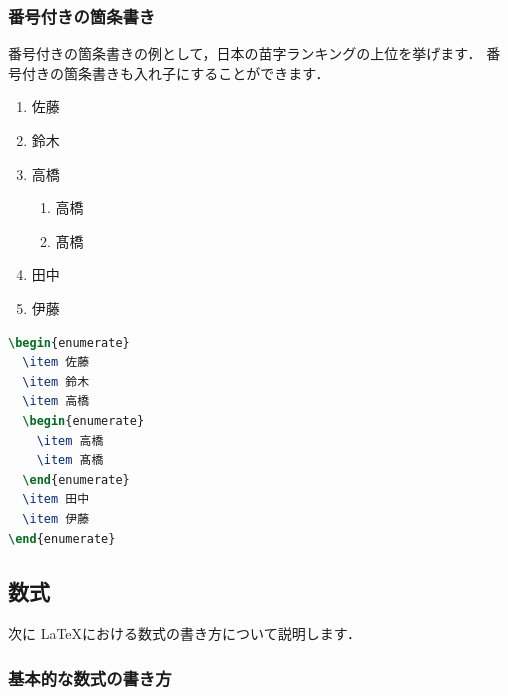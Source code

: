 \documentclass[
    paper=a4paper,      %
    article,            %
    fontsize=11pt,      %
    jafontsize=11pt,    %
    head_space=25mm,    %
    foot_space=25mm,    %
    gutter=20mm,        %
    fore-edge=20mm      %
    ]{jlreq}            %
\begin{document}
\vspace{-10mm}

\subsubsection{番号付きの箇条書き}
\label{sssec:enumerate}

番号付きの箇条書きの例として，日本の苗字ランキングの上位を挙げます．
番号付きの箇条書きも入れ子にすることができます．

\vspace{-3mm}

\begin{multicols}{2}
  \begin{enumerate}
    \item 佐藤
    \item 鈴木
    \item 高橋
    \begin{enumerate}
      \item 高橋
      \item 髙橋
    \end{enumerate}
    \item 田中
    \item 伊藤
  \end{enumerate}
  \columnbreak
\begin{lstlisting}[language=TeX]
\begin{enumerate}
  \item 佐藤
  \item 鈴木
  \item 高橋
  \begin{enumerate}
    \item 高橋
    \item 髙橋
  \end{enumerate}
  \item 田中
  \item 伊藤
\end{enumerate}
\end{lstlisting}
\end{multicols}

\subsection{数式}
\label{ssec:math}

次に \LaTeX における数式の書き方について説明します．

\subsubsection{基本的な数式の書き方}
\label{sssec:math-basic}
\end{document}
